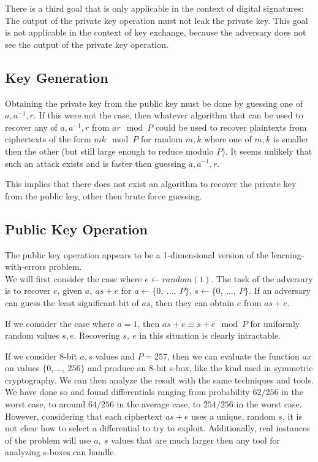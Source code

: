 \documentclass[preprint]{iacrtrans}
\begin{document}
There is a third goal that is only applicable in the context of digital signatures: The output of the private key operation must not leak the private key. This goal is not applicable in the context of key exchange, because the adversary does not see the output of the private key operation.

\subsection{Key Generation}
Obtaining the private key from the public key must be done by guessing one of $a, a^{-1}, r$. If this were not the case, then whatever algorithm that can be used to recover any of $a, a^{-1}, r$ from $a r \mod P$ could be used to recover plaintexts from ciphertexts of the form $m k \mod P$ for random $m, k$ where one of $m, k$ is smaller then the other (but still large enough to reduce modulo $P$). It seems unlikely that such an attack exists and is faster then guessing $a, a^{-1},  r$. 

This implies that there does not exist an algorithm to recover the private key from the public key, other then brute force guessing.

\subsection{Public Key Operation}
The public key operation appears to be a 1-dimensional version of the learning-with-errors problem.\\

We will first consider the case where $e \leftarrow random(1)$. The task of the adversary is to recover $e$, given $a,\ a s + e$ for $a \leftarrow \{0,\ \dots,\ P\}$, $s \leftarrow \{0,\ \dots,\ P\}$. If an adversary can guess the least significant bit of $a s$, then they can obtain $e$ from $a s + e$.

If we consider the case where $a = 1$, then $a s + e \equiv s + e \mod P$ for uniformly random values $s, e$. Recovering $s,\ e$ in this situation is clearly intractable.

If we consider 8-bit $a, s$ values and $P = 257$, then we can evaluate the function $a x$ on values $\{0,\dots,\ 256\}$ and produce an 8-bit s-box, like the kind used in symmetric cryptography. We can then analyze the result with the same techniques and tools. We have done so and found differentials ranging from probability $62/256$ in the worst case, to around $64/256$ in the average case, to $254/256$ in the worst case. However, considering that each ciphertext $a s + e$ uses a unique, random $s$, it is not clear how to select a differential to try to exploit. Additionally, real instances of the problem will use $a,\ s$ values that are much larger then any tool for analyzing s-boxes can handle.
\end{document}
